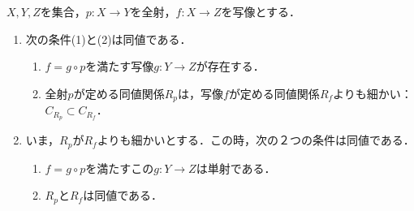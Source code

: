 \documentclass[uplatex,dvipdfmx]{jsreport}
\begin{document}
\begin{proposition}[全射と一般の写像]\label{prop-induced-mapping}
    $X,Y,Z$を集合，$p:X\to Y$を全射，$f:X\to Z$を写像とする．
    \begin{enumerate}
        \item 次の条件(1)と(2)は同値である．
        \begin{enumerate}[(1)]
            \item $f=g\circ p$を満たす写像$g:Y\to Z$が存在する．\begin{center}\end{center}
            \item 全射$p$が定める同値関係$R_p$は，写像$f$が定める同値関係$R_f$よりも細かい：$C_{R_p}\subset C_{R_f}$．
        \end{enumerate}
        \item いま，$R_p$が$R_f$よりも細かいとする．この時，次の２つの条件は同値である．
        \begin{enumerate}[(1)]
            \item $f=g\circ p$を満たすこの$g:Y\to Z$は単射である．
            \item $R_p$と$R_f$は同値である．
        \end{enumerate}
    \end{enumerate}
\end{proposition}
\end{document}
